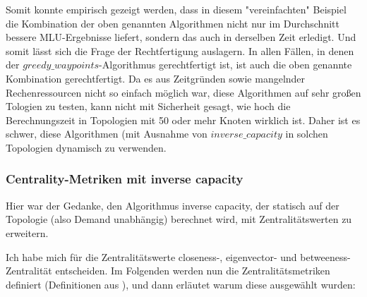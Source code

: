 \documentclass[sigconf, nonacm, review]{acmart}
\begin{document}
Somit konnte empirisch gezeigt werden, 
dass in diesem "vereinfachten" Beispiel die Kombination der oben genannten Algorithmen nicht nur im Durchschnitt bessere MLU-Ergebnisse liefert, 
sondern das auch in derselben Zeit erledigt.
Und somit l\"asst sich die Frage der Rechtfertigung auslagern.
In allen F\"allen, in denen der $greedy\_waypoints$-Algorithmus gerechtfertigt ist,
ist auch die oben genannte Kombination gerechtfertigt.\newline
Da es aus Zeitgr\"unden sowie mangelnder Rechenressourcen nicht so einfach m\"oglich war,
diese Algorithmen auf sehr gro\ss en Tologien zu testen,
kann nicht mit Sicherheit gesagt, wie hoch die Berechnungszeit in Topologien mit 50 oder mehr Knoten wirklich ist.
Daher ist es schwer, diese Algorithmen (mit Ausnahme von $inverse\_capacity$ in solchen Topologien dynamisch zu verwenden.
\subsubsection{Centrality-Metriken mit inverse capacity}
Hier war der Gedanke, den Algorithmus inverse capacity, der statisch auf der Topologie (also Demand unabhängig) berechnet wird, mit Zentralitätswerten zu erweitern.

Ich habe mich für die Zentralitätswerte closeness-, eigenvector- und betweeness-Zentralität entscheiden.
Im Folgenden werden nun die Zentralitätsmetriken definiert (Definitionen aus \cite{guide}), und dann erläutet warum diese ausgewählt wurden:
\end{document}
